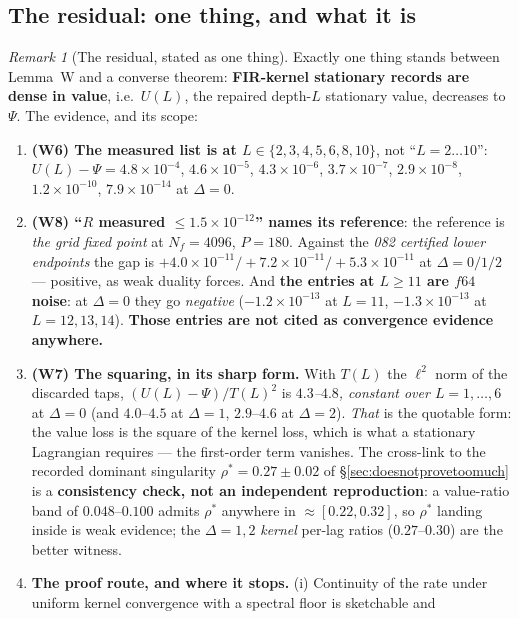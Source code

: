\documentclass[11pt]{article}
\theoremstyle{definition}
\theoremstyle{remark}
\newtheorem{remark}{Remark}
\begin{document}
\subsection{The residual: one thing, and what it is}
\label{sec:residual}
\begin{remark}[The residual, stated as one thing]
\label{rem:residual}
Exactly one thing stands between Lemma~W and a converse theorem:
\textbf{FIR-kernel stationary records are dense in value}, i.e.\ $U(L)$, the
repaired depth-$L$ stationary value, decreases to $\Psi$. The evidence, and
its scope:
\begin{enumerate}
\item[(a)] \textbf{(W6) The measured list is at $L\in\{2,3,4,5,6,8,10\}$}, not
``$L=2\ldots10$'': $U(L)-\Psi=4.8\times10^{-4}$, $4.6\times10^{-5}$,
$4.3\times10^{-6}$, $3.7\times10^{-7}$, $2.9\times10^{-8}$,
$1.2\times10^{-10}$, $7.9\times10^{-14}$ at $\Delta=0$.
\item[(b)] \textbf{(W8) ``$R$ measured $\le1.5\times10^{-12}$'' names its
reference}: the reference is \emph{the grid fixed point} at $N_f=4096$,
$P=180$. Against the \emph{082 certified lower endpoints} the gap is
$+4.0\times10^{-11}/+7.2\times10^{-11}/+5.3\times10^{-11}$ at
$\Delta=0/1/2$ --- positive, as weak duality forces. And \textbf{the entries
at $L\ge11$ are $f64$ noise}: at $\Delta=0$ they go \emph{negative}
($-1.2\times10^{-13}$ at $L=11$, $-1.3\times10^{-13}$ at $L=12,13,14$).
\textbf{Those entries are not cited as convergence evidence anywhere.}
\item[(c)] \textbf{(W7) The squaring, in its sharp form.} With $T(L)$ the
$\ell^2$ norm of the discarded taps, $(U(L)-\Psi)/T(L)^2$ is
\emph{$4.3$--$4.8$, constant over $L=1,\dots,6$} at $\Delta=0$ (and
$4.0$--$4.5$ at $\Delta=1$, $2.9$--$4.6$ at $\Delta=2$). \emph{That} is the
quotable form: the value loss is the square of the kernel loss, which is what
a stationary Lagrangian requires --- the first-order term vanishes. The
cross-link to the recorded dominant singularity $\rho^\ast=0.27\pm0.02$ of
\S\ref{sec:doesnotprovetoomuch} is a \textbf{consistency check, not an
independent reproduction}: a value-ratio band of $0.048$--$0.100$ admits
$\rho^\ast$ anywhere in $\approx[0.22,0.32]$, so $\rho^\ast$ landing inside is
weak evidence; the $\Delta=1,2$ \emph{kernel} per-lag ratios
($0.27$--$0.30$) are the better witness.
\item[(d)] \textbf{The proof route, and where it stops.} (i) Continuity of the
rate under uniform kernel convergence with a spectral floor is sketchable and

\end{enumerate}
\end{remark}
\end{document}
